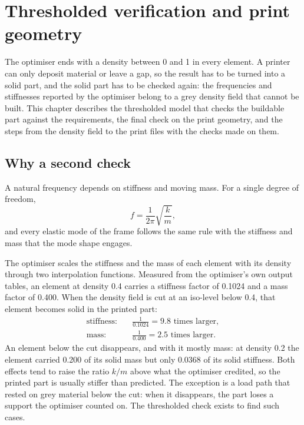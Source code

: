 \chapter{Thresholded verification and print geometry}\label{sec:verification}

The optimiser ends with a density between 0 and 1 in every element. A printer can only deposit material or leave a gap, so the result has to be turned into a solid part, and the solid part has to be checked again: the frequencies and stiffnesses reported by the optimiser belong to a grey density field that cannot be built. This chapter describes the thresholded model that checks the buildable part against the requirements, the final check on the print geometry, and the steps from the density field to the print files with the checks made on them.

\section{Why a second check}\label{sec:verification-why}

A natural frequency depends on stiffness and moving mass. For a single degree of freedom,
\begin{equation}
f = \frac{1}{2\pi}\sqrt{\frac{k}{m}},
\end{equation}
and every elastic mode of the frame follows the same rule with the stiffness and mass that the mode shape engages.

The optimiser scales the stiffness and the mass of each element with its density through two interpolation functions. Measured from the optimiser's own output tables, an element at density 0.4 carries a stiffness factor of 0.1024 and a mass factor of 0.400. When the density field is cut at an iso-level below 0.4, that element becomes solid in the printed part:
\begin{align}
\text{stiffness:}\quad & \frac{1}{0.1024} = 9.8 \text{ times larger},\nonumber\\
\text{mass:}\quad & \frac{1}{0.400} = 2.5 \text{ times larger}.
\end{align}
An element below the cut disappears, and with it mostly mass: at density 0.2 the element carried 0.200 of its solid mass but only 0.0368 of its solid stiffness. Both effects tend to raise the ratio $k/m$ above what the optimiser credited, so the printed part is usually stiffer than predicted. The exception is a load path that rested on grey material below the cut: when it disappears, the part loses a support the optimiser counted on. The thresholded check exists to find such cases.

